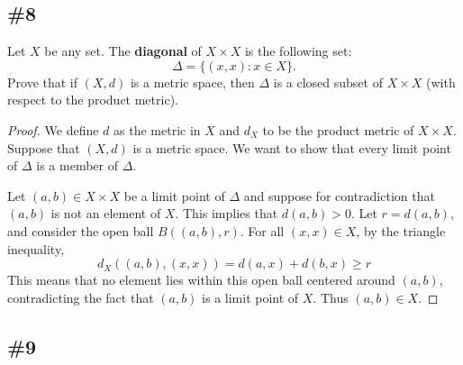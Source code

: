\documentclass{article}
\theoremstyle{plain} %
\numberwithin{thm}{section} %
\theoremstyle{definition}
\begin{document}
        \subsection{\#8}

        Let $X$ be any set. The \textbf{diagonal} of $X\times X$ is the following set:
        \[ \Delta = \{(x,x) : x \in X\}. \]
        Prove that if $(X,d)$ is a metric space, then $\Delta$ is a closed subset of $X\times X$ (with respect to the product metric).

        \begin{proof}
            We define \(d\) as the metric in \(X\) and \(d_X\) to be the product metric of \(X \times X\). Suppose that \((X,d)\) is a metric space. We want to show that every limit point of \(\Delta\) is a member of \(\Delta\).

            Let \((a,b) \in X\times X\) be a limit point of \(\Delta\) and suppose for contradiction that \((a,b)\) is not an element of \(X\). This implies that \(d(a,b) > 0\). Let \(r = d(a,b)\), and consider the open ball \(B((a,b), r)\). For all \((x,x) \in X\), by the triangle inequality,
            \[
                d_X((a,b), (x,x)) = d(a,x) + d(b,x) \geq r
            \]
            This means that no element lies within this open ball centered around \((a,b)\), contradicting the fact that \((a,b)\) is a limit point of \(X\). Thus \((a,b) \in X\).

        \end{proof}

        \subsection{\#9}
\end{document}
